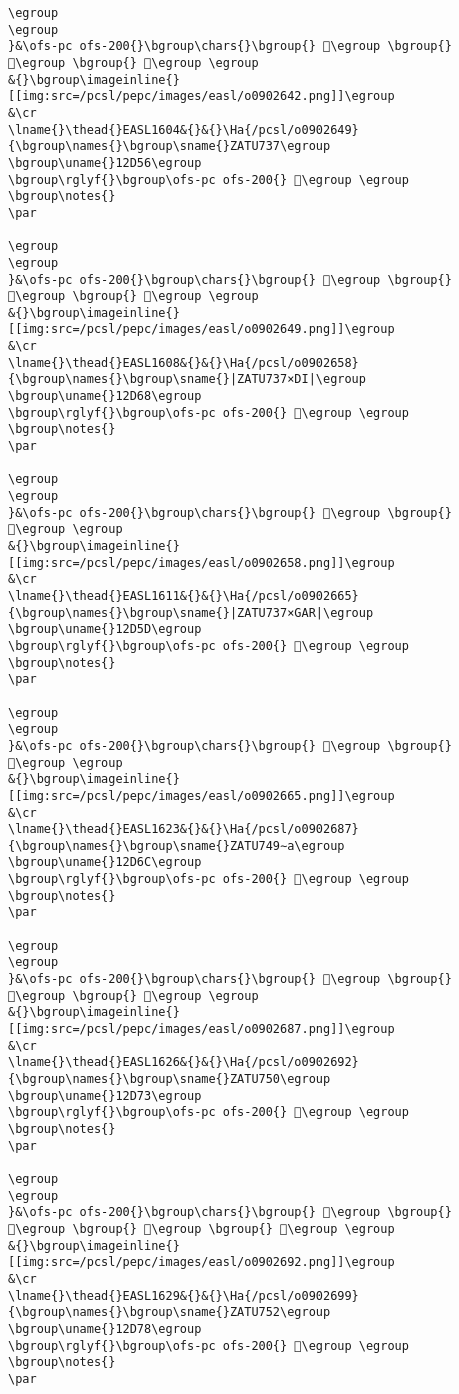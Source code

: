\begin{verbatim}
\egroup
\egroup
}&\ofs-pc ofs-200{}\bgroup\chars{}\bgroup{} 𒵒\egroup \bgroup{} 𒵐\egroup \bgroup{} 𒵑\egroup \egroup
&{}\bgroup\imageinline{}[[img:src=/pcsl/pepc/images/easl/o0902642.png]]\egroup
&\cr
\lname{}\thead{}EASL1604&{}&{}\Ha{/pcsl/o0902649}{\bgroup\names{}\bgroup\sname{}ZATU737\egroup
\bgroup\uname{}12D56\egroup
\bgroup\rglyf{}\bgroup\ofs-pc ofs-200{} 𒵖\egroup \egroup
\bgroup\notes{}
\par 

\egroup
\egroup
}&\ofs-pc ofs-200{}\bgroup\chars{}\bgroup{} 𒵖\egroup \bgroup{} 𒵤\egroup \bgroup{} 𒵧\egroup \egroup
&{}\bgroup\imageinline{}[[img:src=/pcsl/pepc/images/easl/o0902649.png]]\egroup
&\cr
\lname{}\thead{}EASL1608&{}&{}\Ha{/pcsl/o0902658}{\bgroup\names{}\bgroup\sname{}|ZATU737×DI|\egroup
\bgroup\uname{}12D68\egroup
\bgroup\rglyf{}\bgroup\ofs-pc ofs-200{} 𒵨\egroup \egroup
\bgroup\notes{}
\par 

\egroup
\egroup
}&\ofs-pc ofs-200{}\bgroup\chars{}\bgroup{} 𒵚\egroup \bgroup{} 𒵨\egroup \egroup
&{}\bgroup\imageinline{}[[img:src=/pcsl/pepc/images/easl/o0902658.png]]\egroup
&\cr
\lname{}\thead{}EASL1611&{}&{}\Ha{/pcsl/o0902665}{\bgroup\names{}\bgroup\sname{}|ZATU737×GAR|\egroup
\bgroup\uname{}12D5D\egroup
\bgroup\rglyf{}\bgroup\ofs-pc ofs-200{} 𒵝\egroup \egroup
\bgroup\notes{}
\par 

\egroup
\egroup
}&\ofs-pc ofs-200{}\bgroup\chars{}\bgroup{} 𒵝\egroup \bgroup{} 𒵦\egroup \egroup
&{}\bgroup\imageinline{}[[img:src=/pcsl/pepc/images/easl/o0902665.png]]\egroup
&\cr
\lname{}\thead{}EASL1623&{}&{}\Ha{/pcsl/o0902687}{\bgroup\names{}\bgroup\sname{}ZATU749∼a\egroup
\bgroup\uname{}12D6C\egroup
\bgroup\rglyf{}\bgroup\ofs-pc ofs-200{} 𒵬\egroup \egroup
\bgroup\notes{}
\par 

\egroup
\egroup
}&\ofs-pc ofs-200{}\bgroup\chars{}\bgroup{} 𒵬\egroup \bgroup{} 𒵭\egroup \bgroup{} 𒵮\egroup \egroup
&{}\bgroup\imageinline{}[[img:src=/pcsl/pepc/images/easl/o0902687.png]]\egroup
&\cr
\lname{}\thead{}EASL1626&{}&{}\Ha{/pcsl/o0902692}{\bgroup\names{}\bgroup\sname{}ZATU750\egroup
\bgroup\uname{}12D73\egroup
\bgroup\rglyf{}\bgroup\ofs-pc ofs-200{} 𒵳\egroup \egroup
\bgroup\notes{}
\par 

\egroup
\egroup
}&\ofs-pc ofs-200{}\bgroup\chars{}\bgroup{} 𒵱\egroup \bgroup{} 𒵲\egroup \bgroup{} 𒵳\egroup \bgroup{} 𒵴\egroup \egroup
&{}\bgroup\imageinline{}[[img:src=/pcsl/pepc/images/easl/o0902692.png]]\egroup
&\cr
\lname{}\thead{}EASL1629&{}&{}\Ha{/pcsl/o0902699}{\bgroup\names{}\bgroup\sname{}ZATU752\egroup
\bgroup\uname{}12D78\egroup
\bgroup\rglyf{}\bgroup\ofs-pc ofs-200{} 𒵸\egroup \egroup
\bgroup\notes{}
\par 


\end{verbatim}
